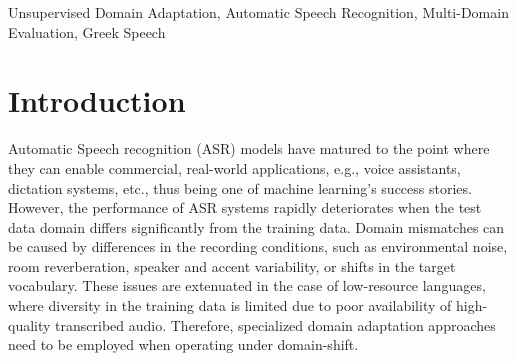 \documentclass[journal]{IEEEtran}
\begin{document}
\begin{IEEEkeywords}
 Unsupervised Domain Adaptation,  Automatic Speech Recognition, Multi-Domain Evaluation, Greek Speech
\end{IEEEkeywords}

%
\section{Introduction}
\label{sec:intro}


Automatic Speech recognition (ASR) models have matured to the point where they can enable commercial, real-world applications, e.g., voice assistants, dictation systems, etc., thus being one of machine learning's success stories.
However, the performance of ASR systems rapidly deteriorates when the test data domain differs significantly from the training data.
Domain mismatches can be caused by differences in the recording conditions, such as environmental noise, room reverberation, speaker and accent variability, or shifts in the target vocabulary.
These issues are extenuated in the case of low-resource languages, where diversity in the training data is limited due to poor availability of high-quality transcribed audio. Therefore, specialized domain adaptation approaches need to be employed when operating under domain-shift.
\end{document}
